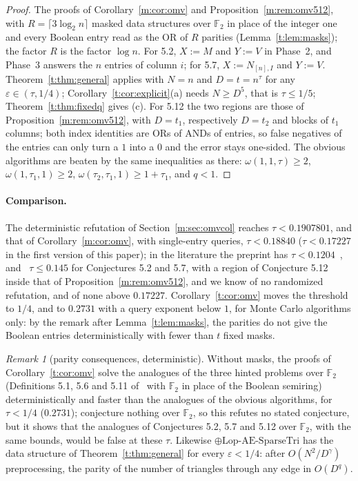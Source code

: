 \documentclass[11pt]{article}
\theoremstyle{definition}
\theoremstyle{remark}
\newtheorem{remark}[theorem]{Remark}
\newcommand{\F}{\mathbb{F}_2}
\newcommand{\Lop}{\mathrm{Lop}\text{-}\allowbreak\mathrm{AE}\text{-}\allowbreak\mathrm{SparseTri}}
\newcommand{\HintedOMvRfourteen}{0.18840}%
\newcommand{\HintedOMvRtwenty}{0.1907801}%
\newcommand{\HintedOMvLitDet}{0.17227}%
\newcommand{\HintedOMvMcOurs}{0.2731}%
\begin{document}
\begin{proof}
The proofs of Corollary~\ref{m:cor:omv} and Proposition~\ref{m:rem:omv512}, with $R=\lceil3\log_2n\rceil$ masked data structures over $\F$ in place of the integer one and every Boolean entry read as the OR of $R$ parities (Lemma~\ref{t:lem:masks}); the factor $R$ is the factor $\log n$. For 5.2, $X:=M$ and $Y:=V$ in Phase~2, and Phase~3 answers the $n$ entries of column $i$; for 5.7, $X:=N_{[n],I}$ and $Y:=V$. Theorem~\ref{t:thm:general} applies with $N=n$ and $D=t=n^\tau$ for any $\varepsilon\in(\tau,1/4)$; Corollary~\ref{t:cor:explicit}(a) needs $N\ge D^5$, that is $\tau\le1/5$; Theorem~\ref{t:thm:fixedq} gives (c). For 5.12 the two regions are those of Proposition~\ref{m:rem:omv512}, with $D=t_1$, respectively $D=t_2$ and blocks of $t_1$ columns; both index identities are ORs of ANDs of entries, so false negatives of the entries can only turn a $1$ into a $0$ and the error stays one-sided. The obvious algorithms are beaten by the same inequalities as there: $\omega(1,1,\tau)\ge2$, $\omega(1,\tau_1,1)\ge2$, $\omega(\tau_2,\tau_1,1)\ge1+\tau_1$, and $q<1$.
\end{proof}

\paragraph{Comparison.} The deterministic refutation of Section~\ref{m:sec:omvcol} reaches $\tau<\HintedOMvRtwenty$, and that of Corollary~\ref{m:cor:omv}, with single-entry queries, $\tau<\HintedOMvRfourteen$ ($\tau<\HintedOMvLitDet$ in the first version of this paper); in the literature the preprint has $\tau<0.1204$~\cite{ZT}, and~\cite{Shr26} $\tau\le0.145$ for Conjectures 5.2 and 5.7, with a region of Conjecture 5.12 inside that of Proposition~\ref{m:rem:omv512}, and we know of no randomized refutation, and of none above $\HintedOMvLitDet$. Corollary~\ref{t:cor:omv} moves the threshold to $1/4$, and to $\HintedOMvMcOurs$ with a query exponent below $1$, for Monte Carlo algorithms only: by the remark after Lemma~\ref{t:lem:masks}, the parities do not give the Boolean entries deterministically with fewer than $t$ fixed masks.

\begin{remark}[parity consequences, deterministic]\label{t:rem:parity}
Without masks, the proofs of Corollary~\ref{t:cor:omv} solve the analogues of the three hinted problems over $\F$ (Definitions 5.1, 5.6 and 5.11 of~\cite{BNS19} with $\F$ in place of the Boolean semiring) deterministically and faster than the analogues of the obvious algorithms, for $\tau<1/4$ ($0.2731$); \cite{BNS19} conjecture nothing over $\F$, so this refutes no stated conjecture, but it shows that the analogues of Conjectures 5.2, 5.7 and 5.12 over $\F$, with the same bounds, would be false at these $\tau$. Likewise $\oplus\Lop$ has the data structure of Theorem~\ref{t:thm:general} for every $\varepsilon<1/4$: after $O(N^2/D^\gamma)$ preprocessing, the parity of the number of triangles through any edge in $O(D^q)$.
\end{remark}
\end{document}
